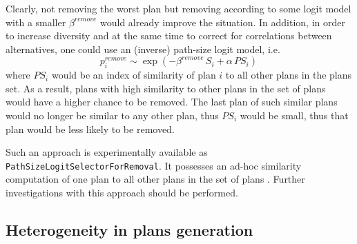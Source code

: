 Clearly, not removing the worst plan but removing according to some logit model with a smaller $\beta^{remove}$ would already improve the situation.  In addition, in order to increase diversity and at the same time to correct for correlations between alternatives, one could use an (inverse) path-size logit \citep[e.g.][]{FrejingerBierlaire2007PathSizeLogit,Prato2009ChoiceModellingSurvey} model, i.e.\
\[
p^{remove}_i \sim \exp( - \beta^{remove} \, S_i + \alpha \, PS_i ) \, 
\]
where $PS_i$ would be an index of similarity of plan $i$ to all other plans in the plans set.  As a result, plans with high similarity to other plans in the set of plans would have a higher chance to be removed.  The last plan of such similar plans would no longer be similar to any other plan, thus $PS_i$ would be small, thus that plan would be less likely to be removed.

Such an approach is experimentally available as \lstinline{PathSizeLogitSelectorForRemoval}.  It possesses an ad-hoc similarity computation of one plan to all other plans in the set of plans \citep[][]{Grether2014PhD}. Further investigations with this approach should be performed.





\subsection{Heterogeneity in plans generation}

